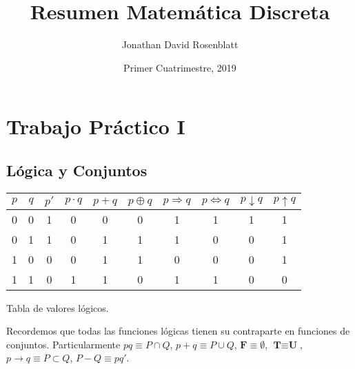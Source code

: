\documentclass[titlepage,a4paper,12pt,twoside]{article}
\title{Resumen Matemática Discreta}
\author{ Jonathan David Rosenblatt }
\date{ Primer Cuatrimestre, 2019 }
\begin{document}
\maketitle

\newpage
\tableofcontents 

\newpage

\maketitle

\section{Trabajo Práctico I}

\subsection{Lógica y Conjuntos}

\begin{table}[htbp]
\centering
\begin{tabular}{|r|c|c|c|c|c|c|c|c|c|}
\hline
 $p$ & $q$ & $p'$ & $p\cdot q$  & $p+q$ & $p\oplus q$ & $p\Rightarrow q$  & $p\Leftrightarrow q$ & $p\downarrow q$ & $p\uparrow q$ \\
\hline
0 & 0 & 1 & 0 & 0 & 0 & 1 & 1 & 1 & 1 \\
0 & 1 & 1 & 0 & 1 & 1 & 1 & 0 & 0 & 1 \\
1 & 0 & 0 & 0 & 1 & 1 & 0 & 0 & 0 & 1 \\
1 & 1 & 0 & 1 & 1 & 0 & 1 & 1 & 0 & 0 \\

\hline
\end{tabular}
\begin{center}
Tabla de valores lógicos.
\end{center}
\label{tabla}
\end{table}

Recordemos que todas las funciones lógicas tienen su contraparte en funciones de conjuntos. Particularmente $pq \equiv P \cap Q $, $p + q \equiv P \cup Q $, $\textbf{F} \equiv \emptyset $, $\textbf{T} \equiv \textbf{U} $, $p \rightarrow q \equiv P \subset Q $, $ P - Q \equiv pq'.$\\
\end{document}
